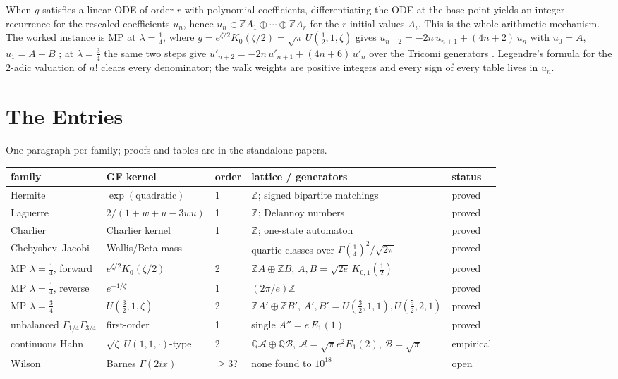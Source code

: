 \documentclass[11pt,a4paper]{article}
\newcommand{\Z}{\mathbb{Z}}
\newcommand{\Q}{\mathbb{Q}}
\begin{document}
When $g$ satisfies a linear ODE of order $r$ with polynomial
coefficients, differentiating the ODE at the base point yields an
integer recurrence for the rescaled coefficients $u_n$, hence
$u_n \in \Z A_1 \oplus \cdots \oplus \Z A_r$ for the $r$ initial
values $A_i$. This is the whole arithmetic mechanism. The worked
instance is MP at $\lambda=\tfrac14$, where
$g = e^{\zeta/2}K_0(\zeta/2) = \sqrt{\pi}\,U(\tfrac12,1,\zeta)$ gives
$u_{n+2} = -2n\,u_{n+1} + (4n+2)\,u_n$ with $u_0 = A$, $u_1 = A-B$
\cite{mp14}; at $\lambda=\tfrac34$ the same two steps give
$u'_{n+2} = -2n\,u'_{n+1} + (4n+6)\,u'_n$ over the Tricomi generators
\cite{mp34}. Legendre's formula for the $2$-adic valuation of $n!$
clears every denominator; the walk weights are positive integers and
every sign of every table lives in $u_n$.

\section{The Entries}

One paragraph per family; proofs and tables are in the standalone
papers.

\begin{center}
\footnotesize
\begin{tabular}{lllll}
\toprule
family & GF kernel & order & lattice / generators & status \\
\midrule
Hermite & $\exp(\text{quadratic})$ & 1 & $\Z$; signed bipartite matchings & proved \cite{herm} \\
Laguerre & $2/(1+w+u-3wu)$ & 1 & $\Z$; Delannoy numbers & proved \cite{lag} \\
Charlier & Charlier kernel & 1 & $\Z$; one-state automaton & proved \cite{char} \\
Chebyshev--Jacobi & Wallis/Beta mass & --- & quartic classes over $\Gamma(\tfrac14)^2/\sqrt{2\pi}$ & proved \cite{jac} \\
MP $\lambda=\tfrac14$, forward & $e^{\zeta/2}K_0(\zeta/2)$ & 2 & $\Z A \oplus \Z B$, $A,B = \sqrt{2e}\,K_{0,1}(\tfrac12)$ & proved \cite{mp14} \\
MP $\lambda=\tfrac14$, reverse & $e^{-1/\zeta}$ & 1 & $(2\pi/e)\Z$ & proved \cite{mp14} \\
MP $\lambda=\tfrac34$ & $U(\tfrac32,1,\zeta)$ & 2 & $\Z A' \oplus \Z B'$, $A',B' = U(\tfrac32,1,1), U(\tfrac52,2,1)$ & proved \cite{mp34} \\
unbalanced $\Gamma_{1/4}\Gamma_{3/4}$ & first-order & 1 & single $A'' = e\,E_1(1)$ & proved \cite{unb} \\
continuous Hahn & $\sqrt{\zeta}\;U(1,1,\cdot)$-type & 2 & $\Q\mathcal{A} \oplus \Q\mathcal{B}$, $\mathcal{A} = \sqrt{\pi}e^2E_1(2)$, $\mathcal{B} = \sqrt{\pi}$ & empirical \cite{hahn} \\
Wilson & Barnes $\Gamma(2ix)$ & $\ge 3$? & none found to $10^{18}$ & open \cite{wil} \\
\bottomrule
\end{tabular}
\end{center}
\end{document}
